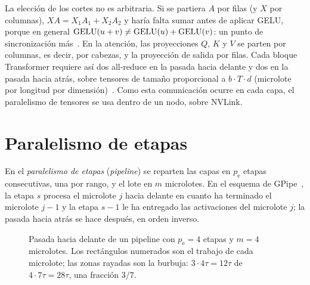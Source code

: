 La elección de los cortes no es arbitraria. Si se partiera $A$ por filas (y $X$ por columnas), $XA=X_1A_1+X_2A_2$ y haría falta sumar antes de aplicar GELU, porque en general $\operatorname{GELU}(u+v)\ne\operatorname{GELU}(u)+\operatorname{GELU}(v)$: un punto de sincronización más~\cite[§3]{megatron}. En la atención, las proyecciones $Q$, $K$ y $V$ se parten por columnas, es decir, por cabezas, y la proyección de salida por filas. Cada bloque Transformer requiere así dos all-reduce en la pasada hacia delante y dos en la pasada hacia atrás, sobre tensores de tamaño proporcional a $b\cdot T\cdot d$ (microlote por longitud por dimensión)~\cite[§3.2]{narayanan}. Como esta comunicación ocurre en cada capa, el paralelismo de tensores se usa dentro de un nodo, sobre NVLink.

\section{Paralelismo de etapas}

\begin{definicion}
En el \emph{paralelismo de etapas} (\emph{pipeline}) se reparten las capas en $p_{\mathrm{e}}$ etapas consecutivas, una por rango, y el lote en $m$ microlotes. En el esquema de GPipe~\cite{gpipe}, la etapa $s$ procesa el microlote $j$ hacia delante en cuanto ha terminado el microlote $j-1$ y la etapa $s-1$ le ha entregado las activaciones del microlote $j$; la pasada hacia atrás se hace después, en orden inverso.
\end{definicion}

\begin{figure}[h]
\centering
{}
\caption{Pasada hacia delante de un pipeline con $p_{\mathrm{e}}=4$ etapas y $m=4$ microlotes. Los rectángulos numerados son el trabajo de cada microlote; las zonas rayadas son la burbuja: $3\cdot 4\tau=12\tau$ de $4\cdot 7\tau=28\tau$, una fracción $3/7$.}
\label{fig:pipeline}
\end{figure}

